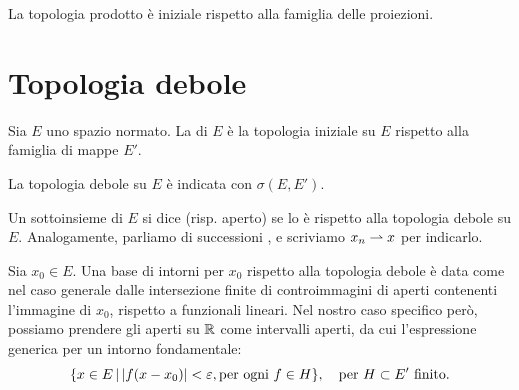 \begin{example}
	La topologia prodotto è iniziale rispetto alla famiglia delle proiezioni.
\end{example}

\section{Topologia debole}
\begin{definition}
	Sia $E$ uno spazio normato.
	La  di $E$ è la topologia iniziale su $E$ rispetto alla famiglia di mappe $E'$.
\end{definition}

\begin{remark}
	La topologia debole su $E$ è indicata con $\sigma(E, E')$.
\end{remark}

Un sottoinsieme di $E$ si dice  (risp. aperto) se lo è rispetto alla topologia debole su $E$. Analogamente, parliamo di successioni , e scriviamo $x_n \rightharpoonup x$ per indicarlo.

Sia $x_0 \in E$. Una base di intorni per $x_0$ rispetto alla topologia debole è data come nel caso generale dalle intersezione finite di controimmagini di aperti contenenti l'immagine di $x_0$, rispetto a funzionali lineari.
Nel nostro caso specifico però, possiamo prendere gli aperti su $\mathbb{R}$ come intervalli aperti, da cui l'espressione generica per un intorno fondamentale:
\begin{equation*}
	\{x \in E \,|\, |f(x - x_0)| < \varepsilon, \text{per ogni $f \in H$} \}, \quad \text{per $H \subset E'$ finito}.
\end{equation*}

